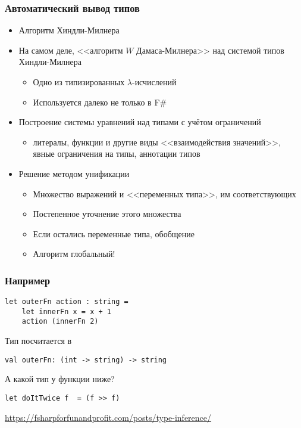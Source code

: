 \documentclass[xetex,mathserif,serif]{beamer}
\newcommand{\attribution}[1] {
    \begin{flushright}\begin{scriptsize}\textcolor{gray}{#1}\end{scriptsize}\end{flushright}
}
\begin{document}
    \begin{frame}
        \frametitle{Автоматический вывод типов}
        \begin{itemize}
            \item Алгоритм Хиндли-Милнера
            \item На самом деле, <<алгоритм $W$ Дамаса-Милнера>> над системой типов Хиндли-Милнера
            \begin{itemize}
                \item Одно из типизированных $\lambda$-исчислений
                \item Используется далеко не только в F\#
            \end{itemize}
            \item Построение системы уравнений над типами с учётом ограничений
            \begin{itemize}
                \item литералы, функции и другие виды <<взаимодействия значений>>, явные ограничения на типы, аннотации типов
            \end{itemize}
            \item Решение методом унификации
            \begin{itemize}
                \item Множество выражений и <<переменных типа>>, им соответствующих
                \item Постепенное уточнение этого множества
                \item Если остались переменные типа, обобщение
                \item Алгоритм глобальный!
            \end{itemize}
        \end{itemize}
    \end{frame}

    \begin{frame}[fragile]
        \frametitle{Например}
        \begin{verbatim}
let outerFn action : string =
    let innerFn x = x + 1
    action (innerFn 2)
        \end{verbatim}

        Тип посчитается в
        \begin{verbatim}
val outerFn: (int -> string) -> string
        \end{verbatim}

        \vspace{1cm}
        А какой тип у функции ниже?
        \begin{verbatim}
let doItTwice f  = (f >> f)
        \end{verbatim}
        \attribution{\url{https://fsharpforfunandprofit.com/posts/type-inference/}}
    \end{frame}
\end{document}
